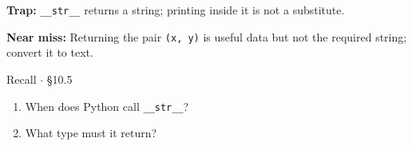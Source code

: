 \documentclass[11pt]{article}
\begin{document}
\begin{keepsection}
\begin{notebox}\textbf{Trap:} \texttt{\_\_str\_\_} returns a string; printing inside it is not a substitute.\end{notebox}

\begin{notebox}\textbf{Near miss:} Returning the pair \texttt{(x, y)} is useful data but not the required string; convert it to text.\end{notebox}

\begin{recallbox}{Recall \ensuremath{\cdot} §10.5}
\begin{enumerate}
\item When does Python call \texttt{\_\_str\_\_}?
\item What type must it return?
\end{enumerate}

\end{recallbox}
\end{keepsection}
\end{document}
